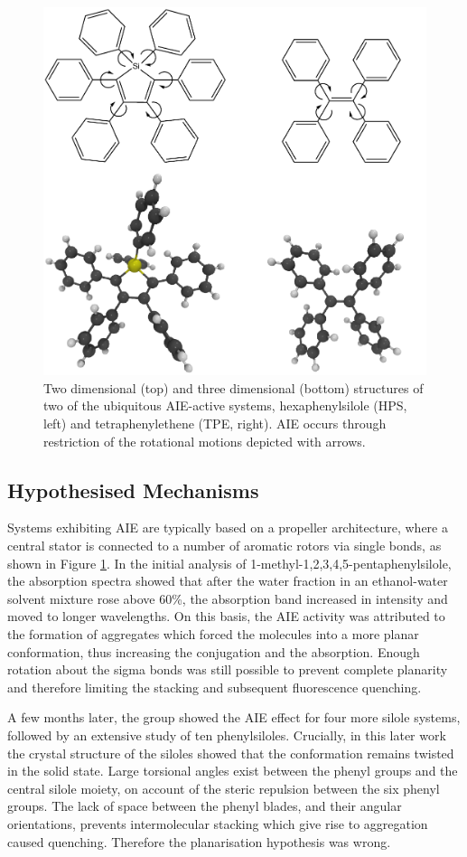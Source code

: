 \begin{figure}[H]
\centering
  \includegraphics[width=0.7\linewidth]{1Intro/HPS_TPE.pdf}
  \caption[Examples of AIE-active chromophores]{Two dimensional (top) and three dimensional (bottom) structures of two of the ubiquitous AIE-active systems, hexaphenylsilole (HPS, left) and tetraphenylethene (\ac{TPE}, right). AIE occurs through restriction of the rotational motions depicted with arrows.}
  \label{figure: HPS_TPE}
\end{figure}
\subsection{Hypothesised Mechanisms}\label{section: lom AIE_mechanisms}
Systems exhibiting \ac{AIE} are typically based on a propeller architecture, where a central stator is connected to a number of aromatic rotors via single bonds, as shown in Figure \ref{figure: HPS_TPE}. In the initial analysis of 1-methyl-1,2,3,4,5-pentaphenylsilole, the absorption spectra showed that after the water fraction in an ethanol-water solvent mixture rose above 60\%, the absorption band increased in intensity and moved to longer wavelengths.\cite{Luo2001} On this basis, the \ac{AIE} activity was attributed to the formation of aggregates which forced the molecules into a more planar conformation, thus increasing the conjugation and the absorption. Enough rotation about the sigma bonds was still possible to prevent complete planarity and therefore limiting the stacking and subsequent fluorescence quenching. 

A few months later, the group showed the \ac{AIE} effect for four more silole systems, followed by an extensive study of ten phenylsiloles.\cite{Tang2001,Chen2003} Crucially, in this later work the crystal structure of the siloles showed that the conformation remains twisted in the solid state.\cite{Chen2003} Large torsional angles exist between the phenyl groups and the central silole moiety, on account of the steric repulsion between the six phenyl groups. The lack of space between the phenyl blades, and their angular orientations, prevents intermolecular stacking which give rise to aggregation caused quenching. Therefore the planarisation hypothesis was wrong. 

